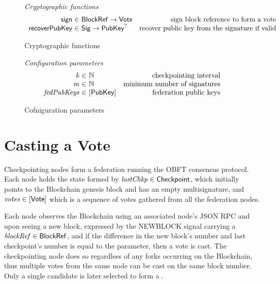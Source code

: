 \begin{figure*}[htb]
  \emph{Cryptographic functions}
  \begin{equation*}
    \begin{array}{r@{~\in~}lr}
      \fun{sign} & \BlockRef \to \Vote & \text{sign block reference to form a vote}\\
      \fun{recoverPubKey} & \Sig \to \PubKey^? & \text{recover public key from the signature if valid}
    \end{array}
  \end{equation*}
  \caption{Cryptographic functions}
  \label{fig:crypto-funs}
\end{figure*}

\begin{figure*}[htb]
  \emph{Configuration parameters}
  \begin{equation*}
    \begin{array}{r@{~\in~}lr}
      \var{k} & \N & \text{checkpointing interval}\\
      \var{m} & \N & \text{minimum number of signatures}\\
      \var{fedPubKeys} & [\PubKey] & \text{federation public keys}\\
    \end{array}
  \end{equation*}
  \caption{Cofniguration parameters}
  \label{fig:config-params}
\end{figure*}


\clearpage
\section{Casting a Vote}

Checkpointing nodes form a federation running the OBFT consensus protocol. Each node holds the state formed by $\mathit{lastChkp} \in \mathsf{Checkpoint}$, which initially points to the Blockchain genesis block and has an empty multisignature, and $\mathit{votes} \in \mathsf{[Vote]}$ which is a sequence of votes gathered from all the federation nodes. 

Each node observes the Blockchain using an associated node's JSON RPC and upon seeing a new block, expressed by the NEWBLOCK signal carrying a $\mathit{blockRef} \in \mathsf{BlockRef}$, and if the difference in the new block's number and last checkpoint's number is equal to the  parameter, then a vote is cast. The checkpointing node does so regardless of any forks occurring on the Blockchain, thus multiple votes from the same node can be cast on the same block number. Only a single candidate is later selected to form a \Chkp.

